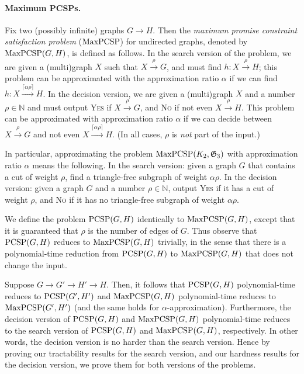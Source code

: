 \documentclass[a4paper,11pt, DIV=11]{scrartcl}
\renewcommand{\G}{\ensuremath{\mathfrak{G}}}
\DeclareMathOperator{\maxPCSP}{\textup{MaxPCSP}}
\DeclareMathOperator{\PCSP}{\textup{PCSP}}
\newcommand{\N}{\ensuremath{\mathbb{N}}}
\theoremstyle{plain}
\theoremstyle{definition}
\begin{document}
\paragraph{Maximum PCSPs.} Fix two (possibly infinite) graphs $G \rightarrow H$. Then the \emph{maximum promise constraint satisfaction problem} ($\maxPCSP$) for undirected graphs, denoted by $\maxPCSP(G, H)$, is defined as follows. In the search version of the problem, we are given a (multi)graph $X$ such that $X \xrightarrow{\rho} G$, and must find $h :X \xrightarrow{\rho} H$; this problem can be approximated with the approximation ratio $\alpha$ if we can find $h : X\xrightarrow{\lceil \alpha \rho\rceil} H$. In the decision version, we are given a (multi)graph $X$ and a number $\rho \in \N$ and must output \textsc{Yes} if $X \xrightarrow{\rho}G$, and \textsc{No} if not even $X \xrightarrow{\rho}H$. This problem can be approximated with approximation ratio $\alpha$ if we can decide between $X \xrightarrow{\rho}G$ and not even $X \xrightarrow{\lceil\alpha \rho\rceil} H$. (In all cases, $\rho$ is \emph{not} part of the input.)

In particular, approximating the problem $\maxPCSP(K_2, \G_3)$ with approximation ratio $\alpha$ means the following. In the search version: given a graph $G$ that contains a cut of weight $\rho$, find a triangle-free subgraph of weight $\alpha \rho$. In the decision version: given a graph $G$ and a number $\rho \in \N$, output \textsc{Yes} if it has a cut of weight $\rho$, and \textsc{No} if it has no triangle-free subgraph of weight $\alpha \rho$.

We define the problem $\PCSP(G, H)$ identically to $\maxPCSP(G, H)$, except that it is guaranteed that $\rho$ is the number of edges of $G$. Thus observe that $\PCSP(G, H)$ reduces to $\maxPCSP(G, H)$ trivially, in the sense that there is a polynomial-time reduction from $\PCSP(G,H)$ to $\maxPCSP(G,H)$ that does not change the input.
 
Suppose $G \to G' \to H' \to H$. Then, it follows that 
 $\PCSP(G, H)$ polynomial-time reduces to $\PCSP(G', H')$
and $\maxPCSP(G, H)$ polynomial-time reduces to $\maxPCSP(G', H')$ (and the same holds for $\alpha$-approximation).
Furthermore, the decision version of $\PCSP(G,H)$ and $\maxPCSP(G, H)$ polynomial-time reduces to the search version of $\PCSP(G,H)$ and $\maxPCSP(G,H)$, respectively. In other words, the decision version is no harder than the search version. Hence by proving our tractability results for the search version, and our hardness results for the decision version, we prove them for both versions of the problems.
\end{document}
